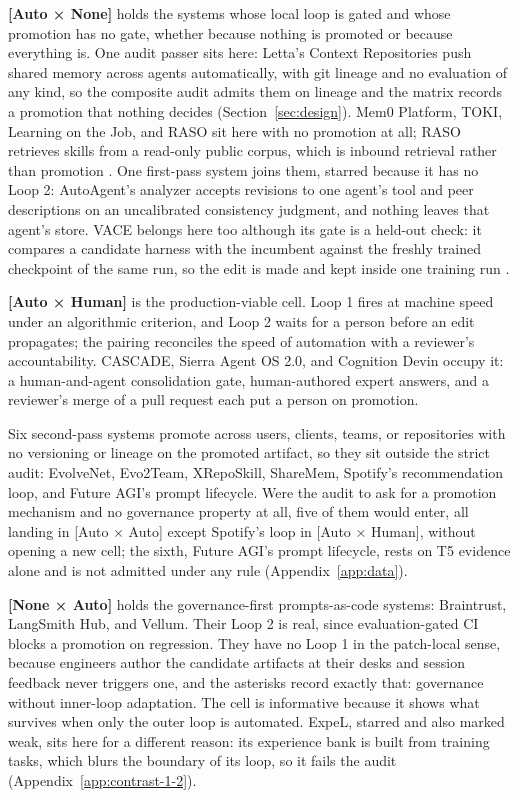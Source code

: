 \documentclass[
  11pt,
]{article}
\begin{document}
\textbf{{[}Auto × None{]}} holds the systems whose local loop is gated and whose promotion has no gate, whether because nothing is promoted or because everything is. One audit passer sits here: Letta's Context Repositories push shared memory across agents automatically, with git lineage and no evaluation of any kind, so the composite audit admits them on lineage and the matrix records a promotion that nothing decides (Section~\ref{sec:design}). Mem0 Platform, TOKI, Learning on the Job, and RASO sit here with no promotion at all; RASO retrieves skills from a read-only public corpus, which is inbound retrieval rather than promotion \cite{chu2026raso}. One first-pass system joins them, starred because it has no Loop 2: AutoAgent's analyzer accepts revisions to one agent's tool and peer descriptions on an uncalibrated consistency judgment, and nothing leaves that agent's store. VACE belongs here too although its gate is a held-out check: it compares a candidate harness with the incumbent against the freshly trained checkpoint of the same run, so the edit is made and kept inside one training run \cite{qi2026vace}.

\textbf{{[}Auto × Human{]}} is the production-viable cell. Loop 1 fires at machine speed under an algorithmic criterion, and Loop 2 waits for a person before an edit propagates; the pairing reconciles the speed of automation with a reviewer's accountability. CASCADE, Sierra Agent OS 2.0, and Cognition Devin occupy it: a human-and-agent consolidation gate, human-authored expert answers, and a reviewer's merge of a pull request each put a person on promotion.

Six second-pass systems promote across users, clients, teams, or repositories with no versioning or lineage on the promoted artifact, so they sit outside the strict audit: EvolveNet, Evo2Team, XRepoSkill, ShareMem, Spotify's recommendation loop, and Future AGI's prompt lifecycle. Were the audit to ask for a promotion mechanism and no governance property at all, five of them would enter, all landing in {[}Auto × Auto{]} except Spotify's loop in {[}Auto × Human{]}, without opening a new cell; the sixth, Future AGI's prompt lifecycle, rests on T5 evidence alone and is not admitted under any rule (Appendix~\ref{app:data}).

\textbf{{[}None × Auto{]}} holds the governance-first prompts-as-code systems: Braintrust, LangSmith Hub, and Vellum. Their Loop 2 is real, since evaluation-gated CI blocks a promotion on regression. They have no Loop 1 in the patch-local sense, because engineers author the candidate artifacts at their desks and session feedback never triggers one, and the asterisks record exactly that: governance without inner-loop adaptation. The cell is informative because it shows what survives when only the outer loop is automated. ExpeL, starred and also marked weak, sits here for a different reason: its experience bank is built from training tasks, which blurs the boundary of its loop, so it fails the audit (Appendix~\ref{app:contrast-1-2}).
\end{document}
